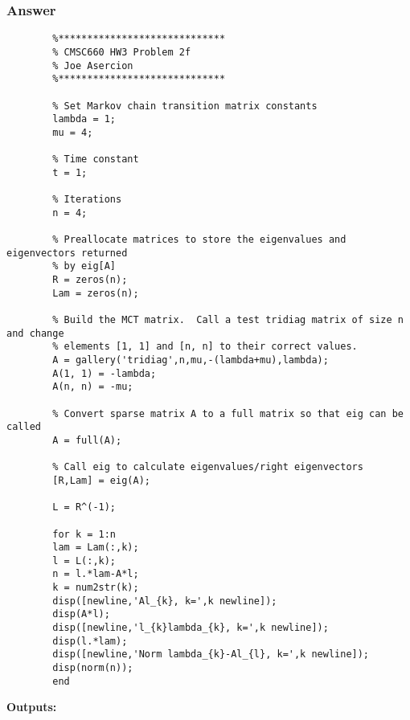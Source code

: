 \documentclass{article}
\newcommand{\n}{\newline}
\begin{document}
		\subsubsection{Answer}
		\begin{lstlisting}
		%*****************************
		% CMSC660 HW3 Problem 2f
		% Joe Asercion
		%***************************** 
		
		% Set Markov chain transition matrix constants
		lambda = 1;
		mu = 4;
		
		% Time constant
		t = 1;
		
		% Iterations
		n = 4;
		
		% Preallocate matrices to store the eigenvalues and eigenvectors returned 
		% by eig[A]
		R = zeros(n);
		Lam = zeros(n);
		
		% Build the MCT matrix.  Call a test tridiag matrix of size n and change
		% elements [1, 1] and [n, n] to their correct values.
		A = gallery('tridiag',n,mu,-(lambda+mu),lambda);
		A(1, 1) = -lambda;
		A(n, n) = -mu;
		
		% Convert sparse matrix A to a full matrix so that eig can be called
		A = full(A);
		
		% Call eig to calculate eigenvalues/right eigenvectors
		[R,Lam] = eig(A);
		
		L = R^(-1);
		
		for k = 1:n
		lam = Lam(:,k);
		l = L(:,k);
		n = l.*lam-A*l;
		k = num2str(k);
		disp([newline,'Al_{k}, k=',k newline]);
		disp(A*l);
		disp([newline,'l_{k}lambda_{k}, k=',k newline]);
		disp(l.*lam);
		disp([newline,'Norm lambda_{k}-Al_{l}, k=',k newline]);
		disp(norm(n));
		end
		\end{lstlisting}
		\textbf{Outputs:\n}
\end{document}
